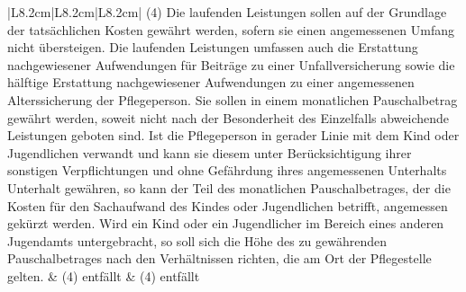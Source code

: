 \documentclass[10pt,a4paper,landscape]{article}
\begin{document}
\begin{longtable}{|L{8.2cm}|L{8.2cm}|L{8.2cm}|}
\hhline{|---|}
(4) \textcolor{diffred}{Die laufenden Leistungen sollen auf der  \newline Grundlage der tatsächlichen Kosten  \newline gewährt werden, sofern sie einen  \newline angemessenen Umfang nicht übersteigen.  \newline Die laufenden Leistungen umfassen auch  \newline die Erstattung nachgewiesener  \newline Aufwendungen für Beiträge zu einer  \newline Unfallversicherung sowie die hälftige  \newline Erstattung nachgewiesener Aufwendungen  \newline zu einer angemessenen Alterssicherung  \newline der Pflegeperson. Sie sollen in einem  \newline monatlichen Pauschalbetrag gewährt  \newline werden, soweit nicht nach der  \newline Besonderheit des Einzelfalls abweichende  \newline Leistungen geboten sind. Ist die  \newline Pflegeperson in gerader Linie mit dem Kind  \newline oder Jugendlichen verwandt und kann sie  \newline diesem unter Berücksichtigung ihrer  \newline sonstigen Verpflichtungen und ohne  \newline Gefährdung ihres angemessenen  \newline Unterhalts Unterhalt gewähren, so kann  \newline der Teil des monatlichen  \newline Pauschalbetrages, der die Kosten für den  \newline Sachaufwand des Kindes oder  \newline Jugendlichen betrifft, angemessen gekürzt  \newline werden. Wird ein Kind oder ein  \newline Jugendlicher im Bereich eines anderen  \newline Jugendamts untergebracht, so soll sich die  \newline Höhe des zu gewährenden  \newline Pauschalbetrages nach den Verhältnissen  \newline richten, die am Ort der Pflegestelle gelten.} & (4) entfällt & (4) entfällt \\

\end{longtable}
\end{document}
